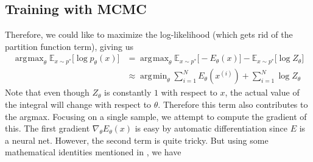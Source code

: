 \documentclass{article}
\DeclareMathOperator*{\argmin}{\arg\!\min}
\DeclareMathOperator*{\argmax}{\arg\!\max}
\begin{document}
\subsection{Training with MCMC}

  Therefore, we could like to maximize the log-likelihood (which gets rid of the partition function term), giving us 
  \begin{align}
    \argmax_\theta \mathbb{E}_{x \sim p^\ast} \big[ \log p_\theta (x) \big] & = \argmax_\theta \mathbb{E}_{x \sim p^\ast}\big[ -E_\theta (x) \big] - \mathbb{E}_{x \sim p^\ast} \big[ \log{Z_\theta} \big] \\
                                                                            & \approx \argmin_\theta \sum_{i=1}^N E_\theta (x^{(i)}) + \sum_{i=1}^N \log Z_\theta
  \end{align} 
  Note that even though $Z_\theta$ is constantly $1$ with respect to $x$, the actual value of the integral will change with respect to $\theta$. Therefore this term also contributes to the argmax. Focusing on a single sample, we attempt to compute the gradient of this. The first gradient $\nabla_\theta E_\theta (x)$ is easy by automatic differentiation since $E$ is a neural net. However, the second term is quite tricky. But using some mathematical identities mentioned in \cite{ebm_train}, we have 
\end{document}
